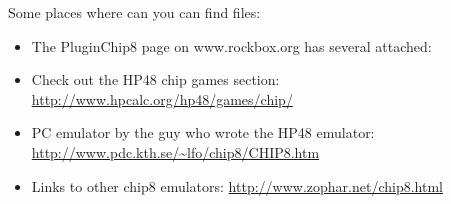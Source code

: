 Some places where can you can find  files:
\begin{itemize}
\item The PluginChip8 page on www.rockbox.org has several attached:
\item Check out the HP48 chip games section:
\url{http://www.hpcalc.org/hp48/games/chip/}
\item PC emulator by the guy who wrote the HP48 emulator:
\url{http://www.pdc.kth.se/~lfo/chip8/CHIP8.htm}
\item Links to other chip8 emulators: 
\url{http://www.zophar.net/chip8.html}
\end{itemize}
